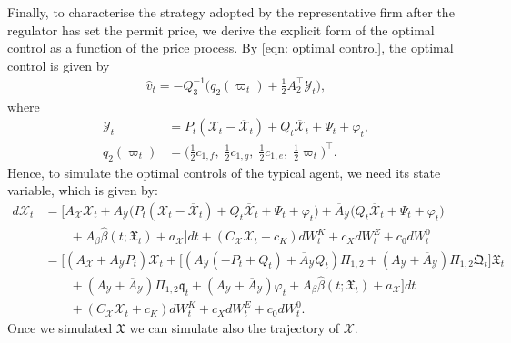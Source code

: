\documentclass[11pt,twoside]{amsart}
\theoremstyle{definition}
\numberwithin{equation}{section}
\renewcommand{\bar}{\overline}
\renewcommand{\hat}{\widehat}
\begin{document}
Finally, to characterise the strategy adopted by the representative firm after the regulator has set the permit price, we derive the explicit form of the optimal control as a function of the price process. By \eqref{eqn: optimal control}, the optimal control is given by
\begin{align*}
\widehat{v}_t
= -Q_3^{-1} \bigg( q_2(\varpi_t) + \frac{1}{2} A_2^\top \mathcal{Y}_t \bigg),
\end{align*}
where
\begin{align*}
\mathcal{Y}_t &= P_t(\mathcal{X}_t - \bar{\mathcal{X}}_t) + Q_t \bar{\mathcal{X}}_t + \Psi_t + \varphi_t,\\
q_2(\varpi_t) &= \bigg( \tfrac{1}{2} c_{1,f},\; \tfrac{1}{2} c_{1,g},\; \tfrac{1}{2} c_{1,e},\; \tfrac{1}{2} \varpi_t \bigg)^\top .
\end{align*}
Hence, to simulate the optimal controls of the typical agent, we need its state variable, which is given by: 
\begin{align*}
d\mathcal{X}_t &= \Bigg[ A_\mathcal{X} \mathcal{X}_t + A_{\mathcal{Y}} \bigg( P_t (\mathcal{X}_t - \bar{\mathcal{X}}_t) + Q_t \bar{\mathcal{X}}_t + \Psi_t + \varphi_t\bigg) + \bar{A}_{\mathcal{Y}}\bigg( Q_t \bar{\mathcal{X}}_t + \Psi_t + \varphi_t\bigg)  \\
&\qquad+ A_\beta \hat\beta(t;\mathfrak{X}_t) + a_\mathcal{X}\Bigg] dt+ (C_\mathcal{X} \mathcal{X}_t + c_K)dW^K_t + c_X dW^E_t + c_0 dW^0_t\\ 
&= \Big[ (A_\mathcal{X} + A_\mathcal{Y}P_t) \mathcal{X}_t + \big[(A_\mathcal{Y}(-P_t + Q_t) + \bar{A}_\mathcal{Y}Q_t) \Pi_{1,2} + (A_\mathcal{Y} + \bar{A}_\mathcal{Y})\Pi_{1,2}\mathfrak{Q}_t\big]\mathfrak{X}_t \\
&\qquad + (A_\mathcal{Y} + \bar{A}_\mathcal{Y})\Pi_{1,2} \mathfrak{q}_t+ (A_\mathcal{Y}+ \bar{A}_\mathcal{Y})\varphi_t+ A_\beta \hat\beta(t;\mathfrak{X}_t) + a_\mathcal{X}\Big] dt\\
&\qquad+ (C_\mathcal{X} \mathcal{X}_t + c_K)dW^K_t + c_X dW^E_t + c_0 dW^0_t.
\end{align*}
Once we simulated $\mathfrak{X}$ we can simulate also the trajectory of $\mathcal{X}$.
\end{document}
